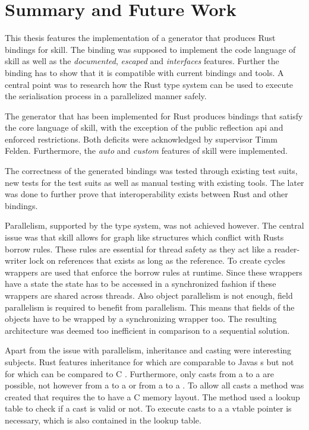 \documentclass[thesis]{subfiles}
\begin{document}
\chapter{Summary and Future Work}%
\vspace*{-.12em}%
This thesis features the implementation of a generator that produces Rust bindings for \gls{skill}.
The binding was supposed to implement the code language of \gls{skill} as well as the \emph{documented}, \emph{escaped} and \emph{interfaces} features.
Further the binding has to show that it is compatible with current bindings and tools.
A central point was to research how the Rust type system can be used to execute the serialisation process in a parallelized manner safely.

The generator that has been implemented for Rust produces bindings that satisfy the core language of \gls{skill}, with the exception of the public reflection \gls{api} and  enforced restrictions.
Both deficits were acknowledged by supervisor Timm Felden.
Furthermore, the \emph{auto} and \emph{custom} features of \gls{skill} were implemented.

The correctness of the generated bindings was tested through existing test suits, new tests for the test suits as well as manual testing with existing tools.
The later was done to further prove that interoperability exists between Rust and other bindings.

Parallelism, supported by the type system, was not achieved however.
The central issue was that \gls{skill} allows for graph like structures which conflict with Rusts borrow rules.
These rules are essential for thread safety as they act like a reader-writer lock on references that exists as long as the reference.
To create cycles wrappers are used that enforce the borrow rules at runtime.
Since these wrappers have a state the state has to be accessed in a synchronized fashion if these wrappers are shared across threads.
Also object parallelism is not enough, field parallelism is required to benefit from parallelism.
This means that fields of the objects have to be wrapped by a synchronizing wrapper too.
The resulting architecture was deemed too inefficient in comparison to a sequential solution.

Apart from the issue with parallelism, inheritance and casting were interesting subjects.
Rust features inheritance for \traits which are comparable to Javas s but not for \structs which can be compared to C \structs.
Furthermore, only casts from a \struct to a \trait are possible, not however from a \trait to a \struct or from a \trait to a \trait.
To allow all casts a method was created that requires the \structs to have a C memory layout.
The method used a lookup table to check if a cast is valid or not.
To execute casts to a \trait a vtable pointer is necessary, which is also contained in the lookup table.
\end{document}
